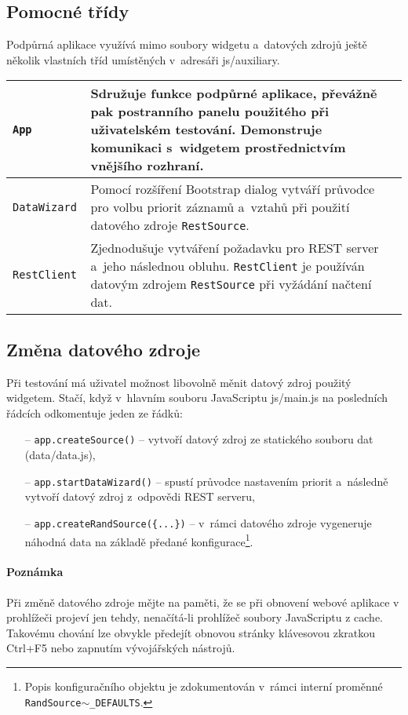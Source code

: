 			\subsection{Pomocné třídy}
			Podpůrná aplikace využívá mimo soubory widgetu a~datových zdrojů ještě několik vlastních tříd umístěných v~adresáři {\sf js/auxiliary}.
			\begin{longtable}{|p{}p{}|}
					\hline
					{\tt App} & Sdružuje funkce podpůrné aplikace, převážně pak postranního panelu použitého při uživatelském testování. Demonstruje komunikaci s~widgetem prostřednictvím vnějšího rozhraní.\\
					\hline
					\tt DataWizard & Pomocí rozšíření {\sf Bootstrap dialog} vytváří průvodce pro volbu priorit záznamů a~vztahů při použití datového zdroje {\tt RestSource}.\\
					\hline
					\tt RestClient & Zjednodušuje vytváření požadavku pro REST server a~jeho následnou obluhu. {\tt RestClient} je používán datovým zdrojem {\tt RestSource} při vyžádání načtení dat.\\
					\hline
				\end{longtable}
				
			\subsection{Změna datového zdroje}
				\label{zmena-zdroje}
				Při testování má uživatel možnost libovolně měnit datový zdroj použitý widgetem. Stačí, když v~hlavním souboru JavaScriptu {\sf js/main.js} na posledních řádcích odkomentuje jeden ze řádků:
				\begin{itemize}
					\item[--] {\tt app.createSource()} -- vytvoří datový zdroj ze statického souboru dat ({\sf data/data.js}),
					\item[--] {\tt app.startDataWizard()} -- spustí průvodce nastavením priorit a~následně vytvoří datový zdroj z~odpovědi REST serveru,
					\item[--] {\tt app.createRandSource(\{...\})} -- v~rámci datového zdroje vygeneruje ná\-hodná data na základě předané konfigurace\footnote{Popis konfiguračního objektu je zdokumentován v~rámci interní proměnné {\tt RandSource$\sim$\_DEFAULTS}.}.
				\end{itemize}
				\paragraph{Poznámka}
				Při změně datového zdroje mějte na paměti, že se při obnovení webové aplikace v prohlížeči projeví jen tehdy, nenačítá-li prohlížeč soubory JavaScriptu z cache. Takovému chování lze obvykle předejít obnovou stránky kláve\-sovou zkratkou {\sf Ctrl+F5} nebo zapnutím vývojářských nástrojů.
				
			
		
	